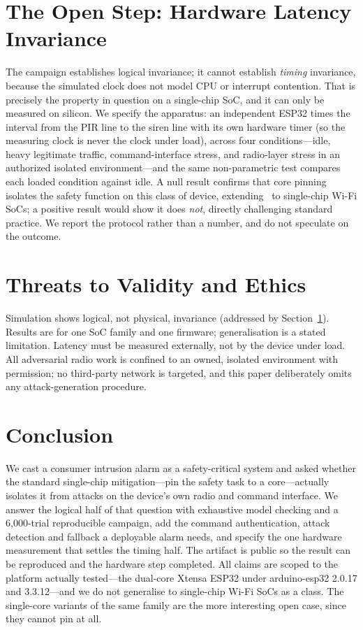\section{The Open Step: Hardware Latency Invariance}\label{sec:hw}
The campaign establishes logical invariance; it cannot establish \emph{timing} invariance,
because the simulated clock does not model CPU or interrupt contention. That is precisely the
property in question on a single-chip SoC, and it can only be measured on silicon. We specify
the apparatus: an independent ESP32 times the interval from the PIR line to the siren line with
its own hardware timer (so the measuring clock is never the clock under load), across four
conditions---idle, heavy legitimate traffic, command-interface stress, and radio-layer stress
in an authorized isolated environment---and the same non-parametric test compares each loaded
condition against idle. A null result confirms that core pinning isolates the safety function on
this class of device, extending~\cite{fischer2020} to single-chip Wi-Fi SoCs; a positive result
would show it does \emph{not}, directly challenging standard practice. We report the protocol
rather than a number, and do not speculate on the outcome.

\section{Threats to Validity and Ethics}
Simulation shows logical, not physical, invariance (addressed by Section~\ref{sec:hw}).
Results are for one SoC family and one firmware; generalisation is a stated limitation. Latency
must be measured externally, not by the device under load. All adversarial radio work is
confined to an owned, isolated environment with permission; no third-party network is targeted,
and this paper deliberately omits any attack-generation procedure.

\section{Conclusion}
We cast a consumer intrusion alarm as a safety-critical system and asked whether the standard
single-chip mitigation---pin the safety task to a core---actually isolates it from attacks on
the device's own radio and command interface. We answer the logical half of that question with
exhaustive model checking and a 6{,}000-trial reproducible campaign, add the command
authentication, attack detection and fallback a deployable alarm needs, and specify the one
hardware measurement that settles the timing half. The artifact is public so the result can be
reproduced and the hardware step completed. All claims are scoped to the platform actually
tested---the dual-core Xtensa ESP32 under arduino-esp32 2.0.17 and 3.3.12---and we do not
generalise to single-chip Wi-Fi SoCs as a class. The single-core variants of the same family are
the more interesting open case, since they cannot pin at all.

